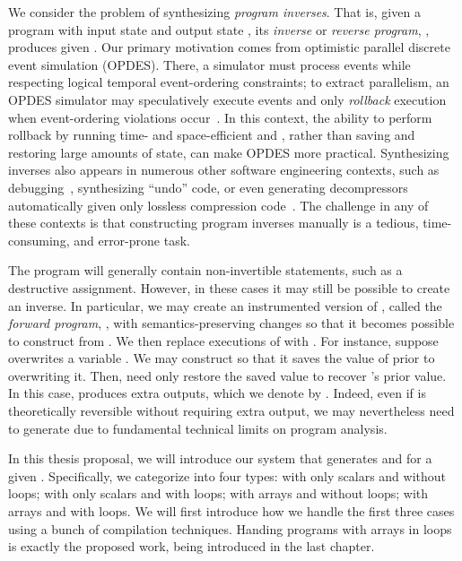 \documentclass[12pt]{gatech-thesis}
\begin{document}
We consider the problem of synthesizing \emph{program inverses}.
That is, given a program \Program with input state \Input and output state \Output, its \emph{inverse} or \emph{reverse program}, \Inverse, produces \Input given \Output.
Our primary motivation comes from optimistic parallel discrete event simulation (OPDES).
There, a simulator must process events while respecting logical temporal event-ordering constraints;
to extract parallelism, an OPDES simulator may speculatively execute events and only \emph{rollback} execution when event-ordering violations occur~\cite{Jefferson1985}.
In this context, the ability to perform rollback by running time- and space-efficient \Program and \Inverse, rather than saving and restoring large amounts of state, can make OPDES more practical.
%
Synthesizing inverses also appears in numerous other software engineering contexts, such as debugging~\cite{Biswas1999}, synthesizing ``undo'' code, or even generating decompressors automatically given only lossless compression code~\cite{Srivastava2011}.
The challenge in any of these contexts is that constructing program inverses manually is a tedious, time-consuming, and error-prone task.

The program \Program will generally contain non-invertible statements, such as a destructive assignment.
However, in these cases it may still be possible to create an inverse.
In particular, we may create an instrumented version of \Program, called the \emph{forward program}, \Forward, with semantics-preserving changes so that it becomes possible to construct \Inverse from \Forward.
We then replace executions of \Program with \Forward.
For instance, suppose \Program overwrites a variable \Var.
We may construct \Forward so that it saves the value of \Var prior to overwriting it.
Then, \Inverse need only restore the saved value to recover \Var's prior value.
In this case, \Forward produces extra outputs, which we denote by \ExtraOuts.
Indeed, even if \Program is theoretically reversible without requiring extra output, we may nevertheless need to generate \ExtraOuts due to fundamental technical limits on program analysis.

In this thesis proposal, we will introduce our system that generates \Forward and \Inverse for a given \Program. 
Specifically, we categorize \Program into four types: \Program with only scalars and without loops; \Program with only scalars and with loops; \Program with arrays and without loops; \Program with arrays and with loops.
We will first introduce how we handle the first three cases using a bunch of compilation techniques.
Handing programs with arrays in loops is exactly the proposed work, being introduced in the last chapter.
\end{document}

